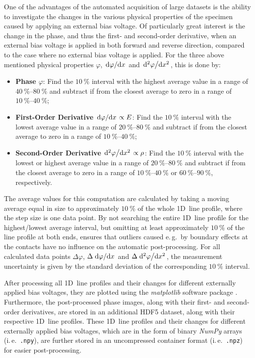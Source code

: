 One of the advantages of the automated acquisition of large datasets is the ability to investigate the changes in the various physical properties of the specimen caused by applying an external bias voltage. Of particularly great interest is the change in the phase, and thus the first- and second-order derivative, when an external bias voltage is applied in both forward and reverse direction, compared to the case where no external bias voltage is applied. For the three above mentioned physical properties $\varphi$, $\dv*{\varphi}{x}$ and $\dv*[2]{\varphi}{x}$, this is done by:
\begin{itemize}
	\item \textbf{Phase $\varphi$}: Find the $\SI{10}{\percent}$ interval with the highest average value in a range of $\SIrange{40}{80}{\percent}$ and subtract if from the closest average to zero in a range of $\SIrange{10}{40}{\percent}$;
	\item \textbf{First-Order Derivative $\dv*{\varphi}{x} \propto E$}: Find the $\SI{10}{\percent}$ interval with the lowest average value in a range of $\SIrange{20}{80}{\percent}$ and subtract if from the closest average to zero in a range of $\SIrange{10}{40}{\percent}$;
	\item \textbf{Second-Order Derivative $\dv*[2]{\varphi}{x} \propto \rho$}: Find the $\SI{10}{\percent}$ interval with the lowest or highest average value in a range of $\SIrange{20}{80}{\percent}$ and subtract if from the closest average to zero in a range of $\SIrange{10}{40}{\percent}$ or $\SIrange{60}{90}{\percent}$, respectively.
\end{itemize}
The average values for this computation are calculated by taking a moving average equal in size to approximately $\SI{10}{\percent}$ of the whole 1D~line profile, where the step size is one data point. By not searching the entire 1D~line profile for the highest/lowest average interval, but omitting at least approximately $\SI{10}{\percent}$ of the line profile at both ends, ensures that outliers caused e.\,g.\ by boundary effects at the contacts have no influence on the automatic post-processing. For all calculated data points $\Delta \varphi$, $\Delta \dv*{\varphi}{x}$ and $\Delta \dv*[2]{\varphi}{x}$, the measurement uncertainty is given by the standard deviation of the corresponding $\SI{10}{\percent}$ interval.

After processing all 1D~line profiles and their changes for different externally applied bias voltages, they are plotted using the \emph{matplotlib} software package \cite{Hunter2007}. Furthermore, the post-processed phase images, along with their first- and second-order derivatives, are stored in an additional HDF5 dataset, along with their respective 1D~line profiles. These 1D~line profiles and their changes for different externally applied bias voltages, which are in the form of binary \emph{NumPy} arrays (i.\,e.\ \texttt{.npy}), are further stored in an uncompressed container format (i.\,e.\ \texttt{.npz}) for easier post-processing.
